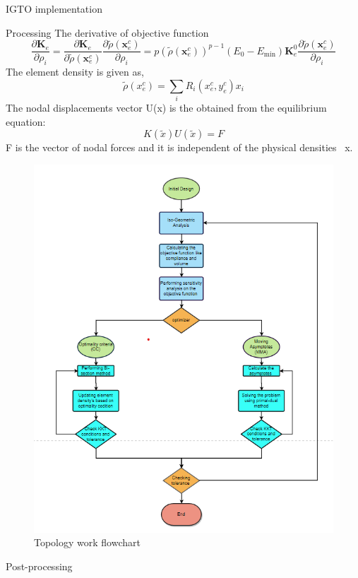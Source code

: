 \documentclass[a4paper,12pt,times]{article}
\begin{document}
\begin{section}{IGTO implementation}
\begin{subsection}{Processing}
The derivative of objective function
\begin{equation}
\frac{\partial \boldsymbol{K}_{e}}{\partial \rho_{i}}=\frac{\partial \boldsymbol{K}_{e}}{\partial \tilde{\rho}\left(\boldsymbol{x}_{e}^{c}\right)} \frac{\partial \tilde{\rho}\left(\boldsymbol{x}_{e}^{c}\right)}{\partial \rho_{i}}=p\left(\tilde{\rho}\left(\boldsymbol{x}_{e}^{c}\right)\right)^{p-1}\left(E_{0}-E_{\min }\right) \boldsymbol{K}_{e}^{0} \frac{\partial \tilde{\rho}\left(\boldsymbol{x}_{e}^{c}\right)}{\partial \rho_{i}}
\end{equation}
The element density is given as,
\begin{equation}
\tilde{\rho}\left(x_{e}^{c}\right)=\sum_{i } R_{i}\left(x_{e}^{c}, y_{e}^{c}\right) x_{i}
\end{equation}
The nodal displacements vector U(x) is the
obtained from the equilibrium equation:
\begin{equation}
K(\tilde{x}) U(\tilde{x})=F
\end{equation}
F is the vector of nodal forces and it is independent of the physical densities ~x.
\begin{figure}[h!]
\centering
\includegraphics[width=0.65\linewidth]{topology flowchart.png}
\caption{Topology work flowchart}
\label{fig:Topology flowchart}
\end{figure}
\end{subsection}

\begin{subsection}{Post-processing}
\end{subsection}

\end{section}

%

%

%

\newpage


\end{document}
